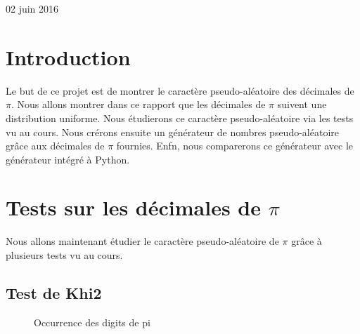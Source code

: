 \documentclass[a4paper,10pt]{article}
\begin{document}
\begin{titlepage}

{\large 02 juin 2016}\\[3cm] %


 

\vfill %

\end{titlepage}

\newpage
\tableofcontents
\newpage

\section{Introduction}
Le but de ce projet est de montrer le caractère pseudo-aléatoire des décimales de $\pi$. Nous allons montrer dans ce rapport que les 
décimales de $\pi$ suivent une distribution uniforme. Nous étudierons ce caractère pseudo-aléatoire via les tests vu au cours. Nous
crérons ensuite un générateur de nombres pseudo-aléatoire grâce aux décimales de $\pi$ fournies. Enfn, nous comparerons ce générateur
avec le générateur intégré à Python.

\section{Tests sur les décimales de $\pi$}

Nous allons maintenant étudier le caractère pseudo-aléatoire de $\pi$ grâce à plusieurs tests vu au cours.

\subsection{Test de Khi2}

\begin{figure}[h!]
\caption{Occurrence des digits de pi}
\label{khi2histo}
\end{figure}
\end{document}
